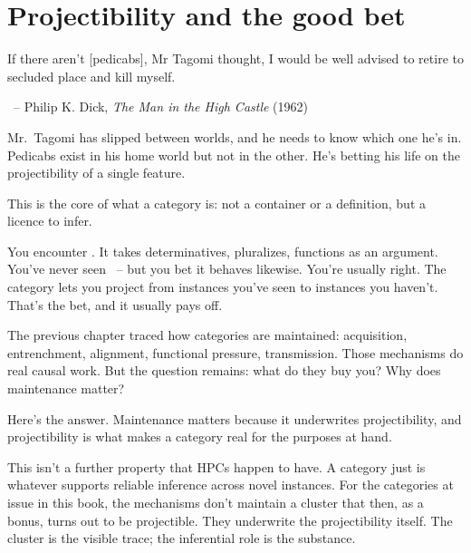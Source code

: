 
\chapter{Projectibility and the good bet}
\label{ch:projectibility}

\epigraph{If there aren't [pedicabs], Mr Tagomi thought, I would be well advised to retire to secluded place and kill myself.}{~-- Philip K. Dick, \textit{The Man in the High Castle} (1962)}

Mr.~Tagomi has slipped between worlds, and he needs to know which one he's in. Pedicabs exist in his home world but not in the other. He's betting his life on the projectibility of a single feature.

This is the core of what a category is: not a container or a definition, but a licence to infer.

You encounter . It takes determinatives, pluralizes, functions as an argument. You've never seen ~-- but you bet it behaves likewise. You're usually right. The category  lets you project from instances you've seen to instances you haven't. That's the bet, and it usually pays off.

The previous chapter traced how categories are maintained: acquisition, entrenchment, alignment, functional pressure, transmission. Those mechanisms do real causal work. But the question remains: what do they buy you? Why does maintenance matter?

Here's the answer. Maintenance matters because it underwrites projectibility, and projectibility is what makes a category real for the purposes at hand.

This isn't a further property that HPCs happen to have. A category just is whatever supports reliable inference across novel instances. For the categories at issue in this book, the mechanisms don't maintain a cluster that then, as a bonus, turns out to be projectible. They underwrite the projectibility itself. The cluster is the visible trace; the inferential role is the substance.

